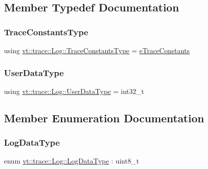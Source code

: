\subsection{Member Typedef Documentation}
\mbox{\label{structvt_1_1trace_1_1_log_a06f69176ce883a9e8a45ffb726fdc558}} 
\subsubsection{\texorpdfstring{Trace\+Constants\+Type}{TraceConstantsType}}
{\footnotesize\ttfamily using \hyperlink{namespacevt_1_1trace_acf454dfbd581b0ebae895f90b5927a1d}{vt\+::trace\+::\+Log\+::\+Trace\+Constants\+Type} =  \hyperlink{namespacevt_1_1trace_acf454dfbd581b0ebae895f90b5927a1d}{e\+Trace\+Constants}}

\mbox{\label{structvt_1_1trace_1_1_log_af392c3825bf45d286a0f77bddf7a96cf}} 
\subsubsection{\texorpdfstring{User\+Data\+Type}{UserDataType}}
{\footnotesize\ttfamily using \hyperlink{structvt_1_1trace_1_1_log_af392c3825bf45d286a0f77bddf7a96cf}{vt\+::trace\+::\+Log\+::\+User\+Data\+Type} =  int32\+\_\+t}



\subsection{Member Enumeration Documentation}
\mbox{\label{structvt_1_1trace_1_1_log_ae1c08093fd18967b7d4912d04d6acc3d}} 
\subsubsection{\texorpdfstring{Log\+Data\+Type}{LogDataType}}
{\footnotesize\ttfamily enum \hyperlink{structvt_1_1trace_1_1_log_ae1c08093fd18967b7d4912d04d6acc3d}{vt\+::trace\+::\+Log\+::\+Log\+Data\+Type} \+: uint8\+\_\+t}

